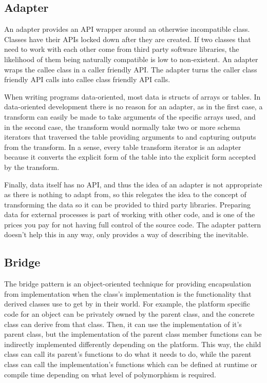 \subsection{Adapter}

An adapter provides an API wrapper around an otherwise incompatible class.
Classes have their APIs locked down after they are created. If two classes that
need to work with each other come from third party software libraries, the
likelihood of them being naturally compatible is low to non-existent. An
adapter wraps the callee class in a caller friendly API. The adapter turns the
caller class friendly API calls into callee class friendly API calls.

When
writing programs data-oriented, most data is structs of arrays or tables. In
data-oriented development there is no reason for an adapter, as in the first
case, a transform can easily be made to take arguments of the specific arrays
used, and in the second case, the transform would normally take two or more
schema iterators that traversed the table providing arguments to and capturing
outputs from the transform. In a sense, every table transform iterator is an
adapter because it converts the explicit form of the table into the explicit
form accepted by the transform.

Finally, data itself has no API, and thus the idea of an adapter is not
appropriate as there is nothing to adapt from, so this relegates the idea to
the concept of transforming the data so it can be provided to third party
libraries. Preparing data for external processes is part of working with other
code, and is one of the prices you pay for not having full control of the
source code. The adapter pattern doesn't help this in any way, only provides
a way of describing the inevitable.

\subsection{Bridge}

The bridge pattern is an object-oriented technique for providing encapsulation
from implementation when the class's implementation is the functionality that
derived classes use to get by in their world. For example, the platform
specific code for an object can be privately owned by the parent class, and the
concrete class can derive from that class. Then, it can use the implementation
of it's parent class, but the implementation of the parent class member
functions can be indirectly implemented differently depending on the platform.
This way, the child class can call its parent's functions to do what it needs to
do, while the parent class can call the implementation's functions which can be
defined at runtime or compile time depending on what level of polymorphism is
required.

